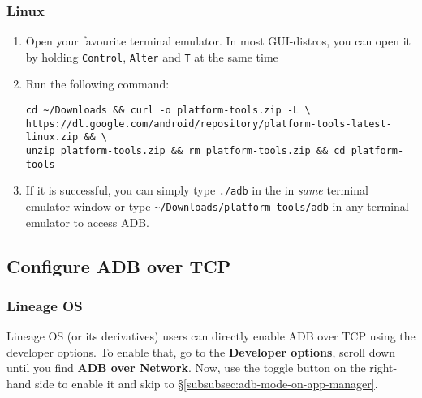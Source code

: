 \subsubsection{Linux} %
\begin{enumerate}
    \item Open your favourite terminal emulator. In most GUI-distros, you can open it by holding \texttt{Control},
    \texttt{Alter} and \texttt{T} at the same time
    \item Run the following command:
    \begin{verbatim}
cd ~/Downloads && curl -o platform-tools.zip -L \
https://dl.google.com/android/repository/platform-tools-latest-linux.zip && \
unzip platform-tools.zip && rm platform-tools.zip && cd platform-tools
    \end{verbatim}
    \item If it is successful, you can simply type \texttt{./adb} in the in \textit{same} terminal emulator window or
    type \texttt{\textasciitilde/Downloads/platform-tools/adb} in any terminal emulator to access ADB\@.
\end{enumerate}

\subsection{Configure ADB over TCP}\label{subsec:configure-adb-over-tcp} %

\subsubsection{Lineage OS}\label{subsubsec:lineage-os} %
Lineage OS (or its derivatives) users can directly enable ADB over TCP using the developer options. To enable that,
go to the \textbf{Developer options}, scroll down until you find \textbf{ADB over Network}. Now, use the toggle button
on the right-hand side to enable it and skip to §\cref{subsubsec:adb-mode-on-app-manager}.

